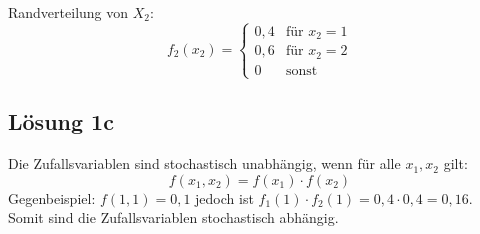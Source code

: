 \documentclass[main.tex]{subfiles}
\begin{document}
Randverteilung von $X_2$:
$$
f_2(x_2) = \begin{cases}
    0,4 & \text{für } x_2 = 1\\
    0,6 & \text{für } x_2 = 2\\
    0 & \text{sonst}
\end{cases}
$$

\subsection{Lösung 1c}
Die Zufallsvariablen sind stochastisch unabhängig, wenn für alle $x_1, x_2$ gilt: $$
    f(x_1, x_2) = f(x_1) \cdot f(x_2)
$$
Gegenbeispiel: $f(1, 1) = 0,1$ jedoch ist $f_1(1) \cdot f_2(1) = 0,4\cdot 0,4 = 0,16$. Somit sind die Zufallsvariablen stochastisch abhängig.
\end{document}

